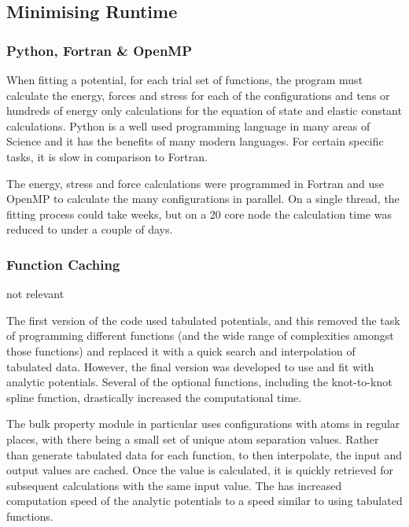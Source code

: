 \subsection{Minimising Runtime}

\subsubsection{Python, Fortran \& OpenMP}

When fitting a potential, for each trial set of functions, the program must calculate the energy, forces and stress for each of the configurations and tens or hundreds of energy only calculations for the equation of state and elastic constant calculations.  Python is a well used programming language in many areas of Science and it has the benefits of many modern languages.  For certain specific tasks, it is slow in comparison to Fortran.

The energy, stress and force calculations were programmed in Fortran and use OpenMP to calculate the many configurations in parallel.  On a single thread, the fitting process could take weeks, but on a 20 core node the calculation time was reduced to under a couple of days.

\subsubsection{Function Caching}

not relevant

The first version of the code used tabulated potentials, and this removed the task of programming different functions (and the wide range of complexities amongst those functions) and replaced it with a quick search and interpolation of tabulated data.  However, the final version was developed to use and fit with analytic potentials.  Several of the optional functions, including the knot-to-knot spline function, drastically increased the computational time.  

The bulk property module in particular uses configurations with atoms in regular places, with there being a small set of unique atom separation values.  Rather than generate tabulated data for each function, to then interpolate, the input and output values are cached.  Once the value is calculated, it is quickly retrieved for subsequent calculations with the same input value.  The has increased computation speed of the analytic potentials to a speed similar to using tabulated functions.



